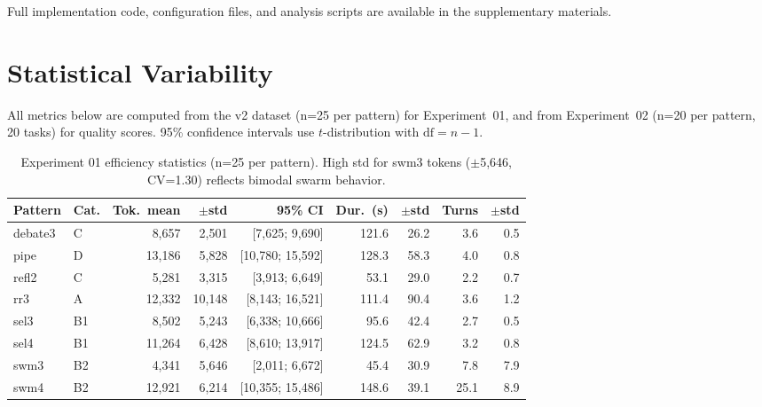 \documentclass{article}
\begin{document}
Full implementation code, configuration files, and analysis scripts are available in the supplementary materials.

\section{Statistical Variability}
\label{app:stats}

All metrics below are computed from the v2 dataset (n=25 per pattern) for Experiment~01, and from Experiment~02 (n=20 per pattern, 20 tasks) for quality scores. 95\% confidence intervals use $t$-distribution with $\text{df}=n{-}1$.

\begin{table}[t]
\centering
\caption{Experiment 01 efficiency statistics (n=25 per pattern). High std for swm3 tokens ($\pm$5,646, CV=1.30) reflects bimodal swarm behavior.}
\label{tab:stats_exp01}
{\small
\begin{tabular}{@{}llrrrrrrr@{}}
\toprule
\textbf{Pattern} & \textbf{Cat.} & \textbf{Tok.\ mean} & $\pm$\textbf{std} & \textbf{95\% CI} & \textbf{Dur.\ (s)} & $\pm$\textbf{std} & \textbf{Turns} & $\pm$\textbf{std} \\
\midrule
debate3 & C & 8,657 & 2,501 & [7,625; 9,690] & 121.6 & 26.2 & 3.6 & 0.5 \\
pipe & D & 13,186 & 5,828 & [10,780; 15,592] & 128.3 & 58.3 & 4.0 & 0.8 \\
refl2 & C & 5,281 & 3,315 & [3,913; 6,649] & 53.1 & 29.0 & 2.2 & 0.7 \\
rr3 & A & 12,332 & 10,148 & [8,143; 16,521] & 111.4 & 90.4 & 3.6 & 1.2 \\
sel3 & B1 & 8,502 & 5,243 & [6,338; 10,666] & 95.6 & 42.4 & 2.7 & 0.5 \\
sel4 & B1 & 11,264 & 6,428 & [8,610; 13,917] & 124.5 & 62.9 & 3.2 & 0.8 \\
swm3 & B2 & 4,341 & 5,646 & [2,011; 6,672] & 45.4 & 30.9 & 7.8 & 7.9 \\
swm4 & B2 & 12,921 & 6,214 & [10,355; 15,486] & 148.6 & 39.1 & 25.1 & 8.9 \\
\bottomrule
\end{tabular}
}
\end{table}
\end{document}
